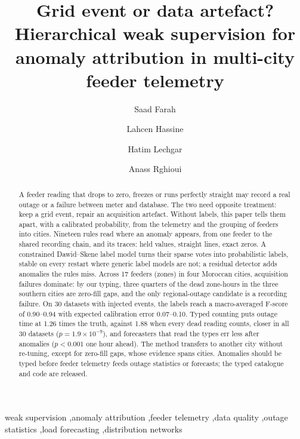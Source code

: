 \documentclass[preprint,12pt]{elsarticle}
\begin{document}
\begin{frontmatter}

\title{Grid event or data artefact? Hierarchical weak supervision for anomaly attribution in multi-city feeder telemetry}

\author[a]{Saad Farah}
\author[b]{Lahcen Hassine}
\author[a]{Hatim Lechgar}
\author[a]{Anass Rghioui}

\begin{abstract}
A feeder reading that drops to zero, freezes or runs perfectly straight may record a real outage or a failure between meter and database. The two need opposite treatment: keep a grid event, repair an acquisition artefact. Without labels, this paper tells them apart, with a calibrated probability, from the telemetry and the grouping of feeders into cities. Nineteen rules read where an anomaly appears, from one feeder to the shared recording chain, and its traces: held values, straight lines, exact zeros. A constrained Dawid--Skene label model turns their sparse votes into probabilistic labels, stable on every restart where generic label models are not; a residual detector adds anomalies the rules miss. Across 17 feeders (zones) in four Moroccan cities, acquisition failures dominate: by our typing, three quarters of the dead zone-hours in the three southern cities are zero-fill gaps, and the only regional-outage candidate is a recording failure. On 30 datasets with injected events, the labels reach a macro-averaged F-score of 0.90--0.94 with expected calibration error 0.07--0.10. Typed counting puts outage time at 1.26 times the truth, against 1.88 when every dead reading counts, closer in all 30 datasets ($p = 1.9 \times 10^{-9}$), and forecasters that read the types err less after anomalies ($p < 0.001$ one hour ahead). The method transfers to another city without re-tuning, except for zero-fill gaps, whose evidence spans cities. Anomalies should be typed before feeder telemetry feeds outage statistics or forecasts; the typed catalogue and code are released.
\end{abstract}

\begin{keyword}
weak supervision \sep anomaly attribution \sep feeder telemetry \sep data quality \sep outage statistics \sep load forecasting \sep distribution networks
\end{keyword}

\end{frontmatter}
\end{document}
